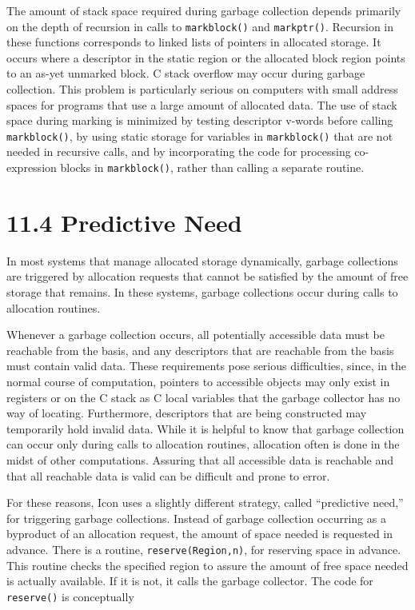 The amount of stack space required during garbage collection depends
primarily on the depth of recursion in calls to \texttt{markblock()}
and \texttt{markptr()}. Recursion in these functions corresponds to
linked lists of pointers in allocated storage. It occurs where a
descriptor in the static region or the allocated block region points
to an as-yet unmarked block. C stack overflow may occur during garbage
collection. This problem is particularly serious on computers with
small address spaces for programs that use a large amount of allocated
data. The use of stack space during marking is minimized by testing
descriptor v-words before calling \texttt{markblock()}, by using
static storage for variables in \texttt{markblock()} that are not
needed in recursive calls, and by incorporating the code for
processing co-expression blocks in \texttt{markblock()}, rather than
calling a separate routine.

\section[11.4 Predictive Need]{11.4 Predictive Need}

In most systems that manage allocated storage dynamically, garbage
collections are triggered by allocation requests that cannot be
satisfied by the amount of free storage that remains. In these
systems, garbage collections occur during calls to allocation routines.

Whenever a garbage collection occurs, all potentially accessible data
must be reachable from the basis, and any descriptors that are
reachable from the basis must contain valid data. These requirements
pose serious difficulties, since, in the normal course of computation,
pointers to accessible objects may only exist in registers or on the C
stack as C local variables that the garbage collector has no way of
locating. Furthermore, descriptors that are being constructed may
temporarily hold invalid data. While it is helpful to know that
garbage collection can occur only during calls to allocation routines,
allocation often is done in the midst of other computations. Assuring
that all accessible data is reachable and that all reachable data is
valid can be difficult and prone to error.

For these reasons, Icon uses a slightly different strategy, called
``predictive need,'' for triggering garbage collections. Instead of
garbage collection occurring as a byproduct of an allocation request,
the amount of space needed is requested in advance. There is a
routine, \texttt{reserve(Region,n)}, for reserving space in
advance. This routine checks the specified region to assure the amount
of free space needed is actually available. If it is not, it calls the
garbage collector. The code for \texttt{reserve()} is conceptually

